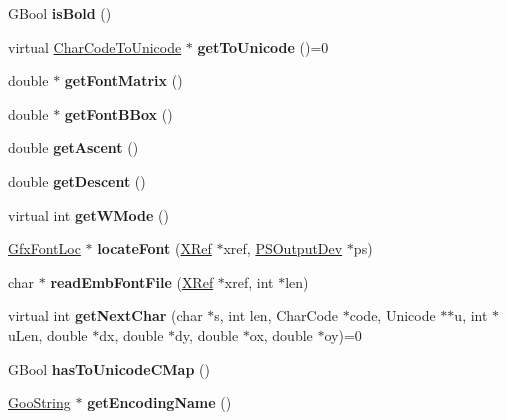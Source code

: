 \begin{DoxyCompactItemize}
G\+Bool {\bfseries is\+Bold} ()
\item 
\mbox{\label{class_gfx_font_aac3ad005a717d58cb356d1bc4eb41edc}} 
virtual \hyperlink{class_char_code_to_unicode}{Char\+Code\+To\+Unicode} $\ast$ {\bfseries get\+To\+Unicode} ()=0
\item 
\mbox{\label{class_gfx_font_a5f30ce4f79d6ea81270d28f5c2cd9691}} 
double $\ast$ {\bfseries get\+Font\+Matrix} ()
\item 
\mbox{\label{class_gfx_font_a65f3ca34d272e68f9c598fe874e45535}} 
double $\ast$ {\bfseries get\+Font\+B\+Box} ()
\item 
\mbox{\label{class_gfx_font_a5dd7f31e956a617ba5f8b4955439d468}} 
double {\bfseries get\+Ascent} ()
\item 
\mbox{\label{class_gfx_font_aeef6db9f15564c1674d9e1ebf6043f6c}} 
double {\bfseries get\+Descent} ()
\item 
\mbox{\label{class_gfx_font_a108416e57acd0a9791269513a680c98d}} 
virtual int {\bfseries get\+W\+Mode} ()
\item 
\mbox{\label{class_gfx_font_a18b069dc19dfbc82186d97468de04ce7}} 
\hyperlink{class_gfx_font_loc}{Gfx\+Font\+Loc} $\ast$ {\bfseries locate\+Font} (\hyperlink{class_x_ref}{X\+Ref} $\ast$xref, \hyperlink{class_p_s_output_dev}{P\+S\+Output\+Dev} $\ast$ps)
\item 
\mbox{\label{class_gfx_font_a224fc25d4b24f221fa86addb260f5d3d}} 
char $\ast$ {\bfseries read\+Emb\+Font\+File} (\hyperlink{class_x_ref}{X\+Ref} $\ast$xref, int $\ast$len)
\item 
\mbox{\label{class_gfx_font_a9deb594c38b58b04293709b9ba61886d}} 
virtual int {\bfseries get\+Next\+Char} (char $\ast$s, int len, Char\+Code $\ast$code, Unicode $\ast$$\ast$u, int $\ast$u\+Len, double $\ast$dx, double $\ast$dy, double $\ast$ox, double $\ast$oy)=0
\item 
\mbox{\label{class_gfx_font_a077b229c11b7c6c253aff54c1bad203a}} 
G\+Bool {\bfseries has\+To\+Unicode\+C\+Map} ()
\item 
\mbox{\label{class_gfx_font_ac86892fa5e135ca6019b962a49516e90}} 
\hyperlink{class_goo_string}{Goo\+String} $\ast$ {\bfseries get\+Encoding\+Name} ()
\end{DoxyCompactItemize}
